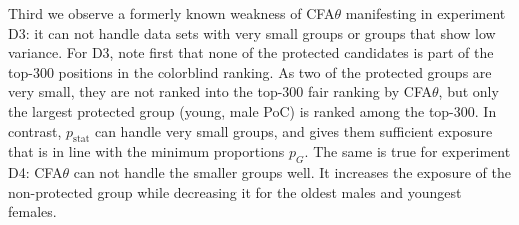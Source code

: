 Third we observe a formerly known weakness of CFA$\theta$ manifesting in experiment D3: it can not handle data sets with very small groups or groups that show low variance.
%
For D3, note first that none of the protected candidates is part of the top-300 positions in the colorblind ranking.
%
As two of the protected groups are very small, they are not ranked into the top-300 fair ranking by CFA$\theta$, but only the largest protected group (young, male PoC) is ranked among the top-300.
%
In contrast, \algoFAIR $p_{\text{stat}}$ can handle very small groups, and gives them sufficient exposure that is in line with the minimum proportions $p_G$.
%
The same is true for experiment D4: CFA$\theta$ can not handle the smaller groups well.
%
It increases the exposure of the non-protected group while decreasing it for the oldest males and youngest females.

